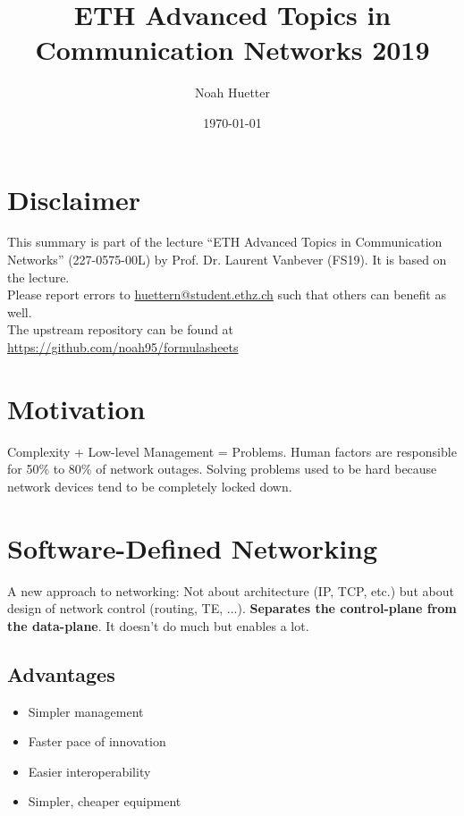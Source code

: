 \documentclass[a4paper, fontsize=8pt, landscape, DIV=1]{scrartcl}
\title{ETH Advanced Topics in Communication Networks 2019}
\author{Noah Huetter}
\date{\today}
\begin{document}
\setcounter{page}{0}
\setcounter{secnumdepth}{2} %
\begin{multicols*}{4}
	\section*{Disclaimer}
	This summary is part of the lecture ``ETH Advanced Topics in Communication Networks'' (227-0575-00L) by Prof. Dr. Laurent Vanbever (FS19). It is based on the lecture. \\[6pt]
	Please report errors to \href{mailto:huettern@student.ethz.ch}{huettern@student.ethz.ch} such that others can benefit as well.\\[6pt]	
  The upstream repository can be found at \href{https://github.com/noah95/formulasheets}{https://github.com/noah95/formulasheets}
	\vfill\null
  \columnbreak
  \tableofcontents
  \vfill\null
	\pagebreak
  \maketitle 
  \setcounter{page}{1}
  \thispagestyle{fancy}


  \section{Motivation}
  Complexity + Low-level Management = Problems. Human factors are responsible
  for 50\% to 80\% of network outages. Solving problems used to be hard because
  network devices tend to be completely locked down.

  \section{Software-Defined Networking}
  A new approach to networking: Not about architecture (IP, TCP, etc.) but 
  about design of network control (routing, TE, ...). \textbf{Separates the
  control-plane from the data-plane}. It doesn't do much but enables a lot.


  \subsection{Advantages}
  \begin{itemize}
    \item Simpler management
    \item Faster pace of innovation
    \item Easier interoperability
    \item Simpler, cheaper equipment
  \end{itemize}


\end{multicols*}
\end{document}
